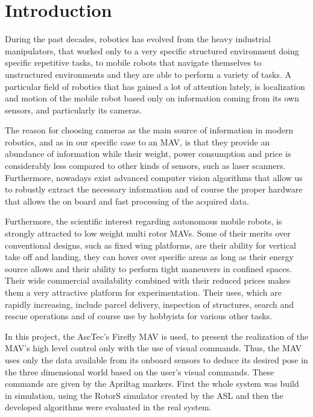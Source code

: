 \chapter{Introduction}
\label{sec:introduction}

During the past decades, robotics has evolved from the heavy industrial manipulators, that worked only to a very specific structured environment doing specific repetitive tasks, to mobile robots that navigate themselves to unstructured environments and they are able to perform a variety of tasks. A particular field of robotics that has gained a lot of attention lately, is localization and motion of the mobile robot based only on information coming from its own sensors, and particularly its cameras.

The reason for choosing cameras as the main source of information in modern robotics, and as in our specific case to an MAV, is that they provide an abundance of information while their weight, power consumption and price is considerably less compared to other kinds of sensors, such as laser scanners. Furthermore, nowadays exist advanced computer vision algorithms that allow us to robustly extract the necessary information and of course the proper hardware that allows the on board and fast processing of the acquired data.  

Furthermore, the scientific interest regarding autonomous mobile robots, is strongly attracted to low weight multi rotor MAVs. Some of their merits over conventional designs, such as fixed wing platforms, are their ability for vertical take off and landing, they can hover over specific areas as long as their energy source allows and their ability to perform tight maneuvers in confined spaces. Their wide commercial availability combined with their reduced prices makes them a very attractive platform for experimentation. Their uses, which are rapidly increasing, include parcel delivery, inspection of structures, search and rescue operations and of course use by hobbyists for various other tasks.     

In this project, the AscTec's Firefly MAV is used, to present the realization of the MAV's high level control only with the use of visual commands. Thus, the MAV uses only the data available from its onboard sensors to deduce its desired pose in the three dimensional world based on the user's visual commands. These commands are given by the Apriltag markers. First the whole system was build in simulation, using the RotorS simulator created by the ASL \cite{RotorsSimulator} and then the developed algorithms were evaluated in the real system. 


